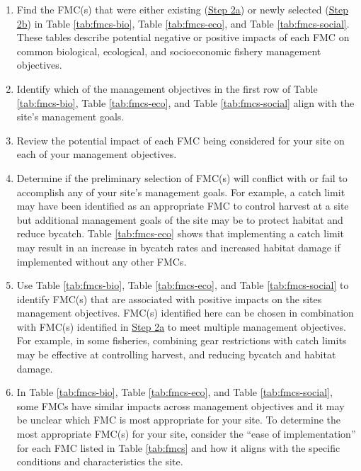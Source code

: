 \documentclass[]{book}
\begin{document}
\begin{enumerate}
\def\labelenumi{\arabic{enumi}.}
\item
  Find the FMC(s) that were either existing
  (\protect\hyperlink{Step2a}{Step 2a}) or newly selected
  (\protect\hyperlink{Step2b}{Step 2b}) in Table \ref{tab:fmcs-bio},
  Table \ref{tab:fmcs-eco}, and Table \ref{tab:fmcs-social}. These
  tables describe potential negative or positive impacts of each FMC on
  common biological, ecological, and socioeconomic fishery management
  objectives.
\item
  Identify which of the management objectives in the first row of Table
  \ref{tab:fmcs-bio}, Table \ref{tab:fmcs-eco}, and Table
  \ref{tab:fmcs-social} align with the site's management goals.
\item
  Review the potential impact of each FMC being considered for your site
  on each of your management objectives.
\item
  Determine if the preliminary selection of FMC(s) will conflict with or
  fail to accomplish any of your site's management goals. For example, a
  catch limit may have been identified as an appropriate FMC to control
  harvest at a site but additional management goals of the site may be
  to protect habitat and reduce bycatch. Table \ref{tab:fmcs-eco} shows
  that implementing a catch limit may result in an increase in bycatch
  rates and increased habitat damage if implemented without any other
  FMCs.
\item
  Use Table \ref{tab:fmcs-bio}, Table \ref{tab:fmcs-eco}, and Table
  \ref{tab:fmcs-social} to identify FMC(s) that are associated with
  positive impacts on the sites management objectives. FMC(s) identified
  here can be chosen in combination with FMC(s) identified in
  \protect\hyperlink{Step2a}{Step 2a} to meet multiple management
  objectives. For example, in some fisheries, combining gear
  restrictions with catch limits may be effective at controlling
  harvest, and reducing bycatch and habitat damage.
\item
  In Table \ref{tab:fmcs-bio}, Table \ref{tab:fmcs-eco}, and Table
  \ref{tab:fmcs-social}, some FMCs have similar impacts across
  management objectives and it may be unclear which FMC is most
  appropriate for your site. To determine the most appropriate FMC(s)
  for your site, consider the ``ease of implementation'' for each FMC
  listed in Table \ref{tab:fmcs} and how it aligns with the specific
  conditions and characteristics the site.
\end{enumerate}
\end{document}
